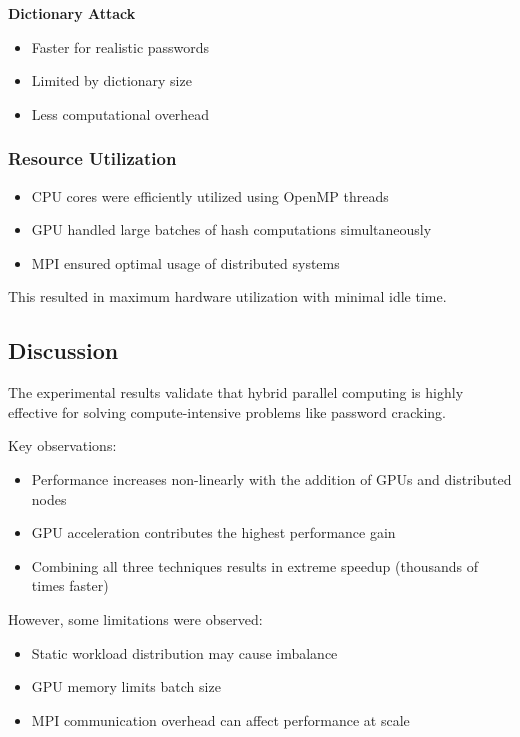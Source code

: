 \documentclass[12pt,a4paper]{article}
\begin{document}
\textbf{Dictionary Attack}
\begin{itemize}
\item Faster for realistic passwords
\item Limited by dictionary size
\item Less computational overhead
\end{itemize}

\subsubsection{Resource Utilization}

\begin{itemize}
\item CPU cores were efficiently utilized using OpenMP threads
\item GPU handled large batches of hash computations simultaneously
\item MPI ensured optimal usage of distributed systems
\end{itemize}

This resulted in maximum hardware utilization with minimal idle time.

\subsection{Discussion}

The experimental results validate that hybrid parallel computing is highly effective for solving compute-intensive problems like password cracking.

Key observations:
\begin{itemize}
\item Performance increases non-linearly with the addition of GPUs and distributed nodes
\item GPU acceleration contributes the highest performance gain
\item Combining all three techniques results in extreme speedup (thousands of times faster)
\end{itemize}

However, some limitations were observed:
\begin{itemize}
\item Static workload distribution may cause imbalance
\item GPU memory limits batch size
\item MPI communication overhead can affect performance at scale
\end{itemize}
\end{document}
